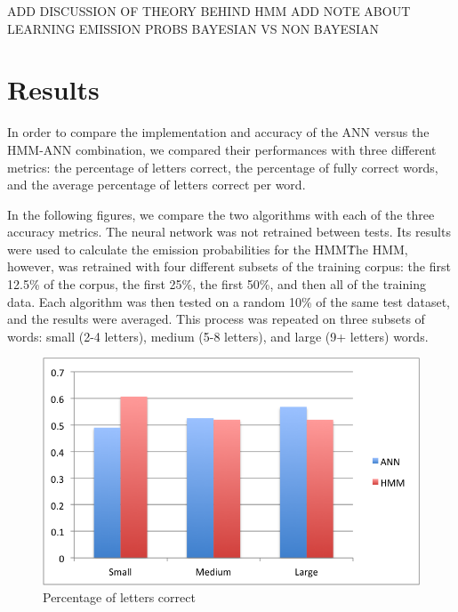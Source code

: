 \documentclass[11pt,a4paper,twocolumn]{article}
\begin{document}
ADD DISCUSSION OF THEORY BEHIND HMM
ADD NOTE ABOUT LEARNING EMISSION PROBS BAYESIAN VS NON BAYESIAN


\section{Results}

In order to compare the implementation and accuracy of the ANN versus the HMM-ANN combination, we
compared their performances with three different metrics: the percentage of letters correct, the
percentage of fully correct words, and the average percentage of letters correct per word.

In the following figures, we compare the two algorithms with each of the three accuracy metrics. The
neural network was not retrained between tests. Its results were used to calculate the emission
probabilities for the HMM\. The HMM, however, was retrained with four different subsets of the
training corpus: the first 12.5\% of the corpus, the first 25\%, the first 50\%, and then all of the
training data. Each algorithm was then tested on a random 10\% of the same test dataset, and the
results were averaged. This process was repeated on three subsets of words: small (2-4 letters),
medium (5-8 letters), and large (9+ letters) words.

\begin{figure}[h]
\centering
\caption{Percentage of letters correct}
\includegraphics[scale=0.55]{img/lettersCorrect.png}
\end{figure}
\end{document}
